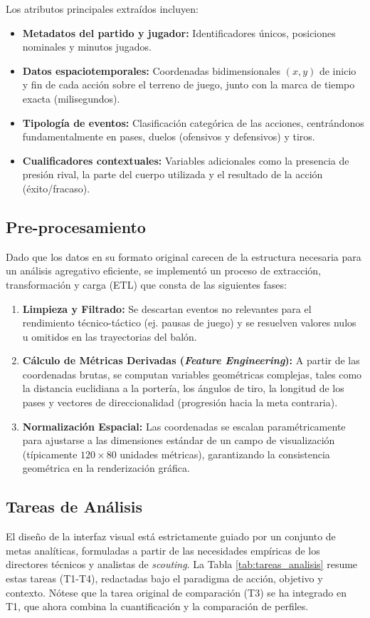 \documentclass[conference]{IEEEtran}
\begin{document}
Los atributos principales extraídos incluyen:
\begin{itemize}
    \item \textbf{Metadatos del partido y jugador:} Identificadores únicos, posiciones nominales y minutos jugados.
    \item \textbf{Datos espaciotemporales:} Coordenadas bidimensionales $(x, y)$ de inicio y fin de cada acción sobre el terreno de juego, junto con la marca de tiempo exacta (milisegundos).
    \item \textbf{Tipología de eventos:} Clasificación categórica de las acciones, centrándonos fundamentalmente en pases, duelos (ofensivos y defensivos) y tiros.
    \item \textbf{Cualificadores contextuales:} Variables adicionales como la presencia de presión rival, la parte del cuerpo utilizada y el resultado de la acción (éxito/fracaso).
\end{itemize}

\subsection{Pre-procesamiento}
Dado que los datos en su formato original carecen de la estructura necesaria para un análisis agregativo eficiente, se implementó un proceso de extracción, transformación y carga (ETL) que consta de las siguientes fases:
\begin{enumerate}
    \item \textbf{Limpieza y Filtrado:} Se descartan eventos no relevantes para el rendimiento técnico-táctico (ej. pausas de juego) y se resuelven valores nulos u omitidos en las trayectorias del balón.
    \item \textbf{Cálculo de Métricas Derivadas (\textit{Feature Engineering}):} A partir de las coordenadas brutas, se computan variables geométricas complejas, tales como la distancia euclidiana a la portería, los ángulos de tiro, la longitud de los pases y vectores de direccionalidad (progresión hacia la meta contraria).
    \item \textbf{Normalización Espacial:} Las coordenadas se escalan paramétricamente para ajustarse a las dimensiones estándar de un campo de visualización (típicamente $120 \times 80$ unidades métricas), garantizando la consistencia geométrica en la renderización gráfica.
\end{enumerate}

\subsection{Tareas de Análisis}
El diseño de la interfaz visual está estrictamente guiado por un conjunto de metas analíticas, formuladas a partir de las necesidades empíricas de los directores técnicos y analistas de \textit{scouting}. La Tabla \ref{tab:tareas_analisis} resume estas tareas (T1-T4), redactadas bajo el paradigma de acción, objetivo y contexto. Nótese que la tarea original de comparación (T3) se ha integrado en T1, que ahora combina la cuantificación y la comparación de perfiles.
\end{document}
